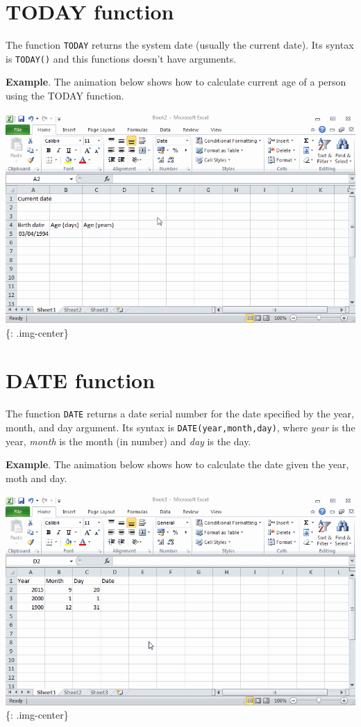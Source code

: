 \section{TODAY function}
\label{todayfunction}

The function \texttt{TODAY} returns the system date (usually the current date). Its syntax is \texttt{TODAY()} and this functions doesn't have arguments. 

\textbf{Example}. The animation below shows how to calculate current age of a person using the TODAY function.

\includegraphics[keepaspectratio,width=\textwidth,height=0.75\textheight]{img/example_function_today.gif}
\{: .img-center\}

\section{DATE function}
\label{datefunction}

The function \texttt{DATE} returns a date serial number for the date specified by the year, month, and day argument. Its syntax is \texttt{DATE(year,month,day)}, where \emph{year} is the year, \emph{month} is the month (in number) and \emph{day} is the day.

\textbf{Example}. The animation below shows how to calculate the date given the year, moth and day.

\includegraphics[keepaspectratio,width=\textwidth,height=0.75\textheight]{img/example_function_date.gif}
\{: .img-center\}

